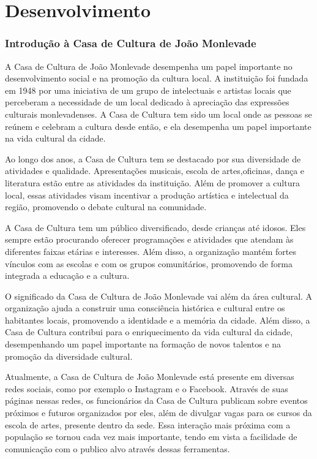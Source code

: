 \chapter{Desenvolvimento}
\label{cap:desenvolvimento}

\subsection{Introdução à Casa de Cultura de João Monlevade}
A Casa de Cultura de João Monlevade desempenha um papel importante no desenvolvimento social e na promoção da cultura local. A instituição foi fundada em 1948 por uma iniciativa de um grupo de intelectuais e artistas locais que perceberam a necessidade de um local dedicado à apreciação das expressões culturais monlevadenses. A Casa de Cultura tem sido um local onde as pessoas se reúnem e celebram a cultura desde então, e ela desempenha um papel importante na vida cultural da cidade.

Ao longo dos anos, a Casa de Cultura tem se destacado por sua diversidade de atividades e qualidade. Apresentações musicais, escola de artes,oficinas, dança e literatura estão entre as atividades da instituição. Além de promover a cultura local, essas atividades visam incentivar a produção artística e intelectual da região, promovendo o debate cultural na comunidade.

A Casa de Cultura tem um público diversificado, desde crianças até idosos. Eles sempre estão procurando oferecer programações e atividades que atendam às diferentes faixas etárias e interesses. Além disso, a organização mantém fortes vínculos com as escolas e com os grupos comunitários, promovendo de forma integrada a educação e a cultura.

O significado da Casa de Cultura de João Monlevade vai além da área cultural. A organização ajuda a construir uma consciência histórica e cultural entre os habitantes locais, promovendo a identidade e a memória da cidade. Além disso, a Casa de Cultura contribui para o enriquecimento da vida cultural da cidade, desempenhando um papel importante na formação de novos talentos e na promoção da diversidade cultural.

Atualmente, a Casa de Cultura de João Monlevade está presente em diversas redes sociais, como por exemplo o Instagram e o Facebook. Através de suas páginas nessas redes, os funcionários da Casa de Cultura publicam sobre eventos próximos e futuros organizados por eles, além de divulgar vagas para os cursos da escola de artes, presente dentro da sede. Essa interação mais próxima com a população se tornou cada vez mais importante, tendo em vista a facilidade de comunicação com o publico alvo através dessas ferramentas.


